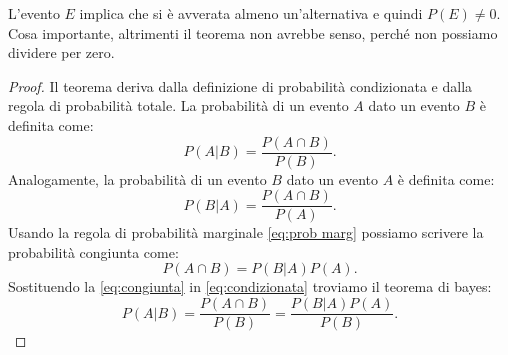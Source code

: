 \documentclass[../main.tex]{subfiles}
\begin{document}
\hfill \break
L'evento $E$ implica che si è avverata almeno un'alternativa e quindi $P(E)\ne 0$. Cosa importante, altrimenti il teorema non avrebbe senso, perché non possiamo dividere per zero.
\begin{proof}
Il teorema deriva dalla definizione di probabilità condizionata e dalla regola di probabilità totale.
La probabilità di un evento $A$ dato un evento $B$ è definita come:
\begin{equation}\label{eq:condizionata}
    P(A|B)=\frac{P(A\cap B)}{P(B)}.
\end{equation}
Analogamente, la probabilità di un evento $B$ dato un evento $A$ è definita come:
\begin{equation}
    P(B|A)=\frac{P(A\cap B)}{P(A)}.
\end{equation}
Usando la regola di probabilità marginale \ref{eq:prob marg} possiamo scrivere la probabilità congiunta come:
\begin{equation}\label{eq:congiunta}
    P(A \cap B )= P(B|A)P(A).
\end{equation}
Sostituendo la \ref{eq:congiunta} in \ref{eq:condizionata} troviamo il teorema di bayes:
\begin{equation}
    P(A|B)= \frac{P(A \cap B)}{P(B)} =\frac{P(B|A)P(A)}{P(B)}.
\end{equation}
\end{proof}
\end{document}
